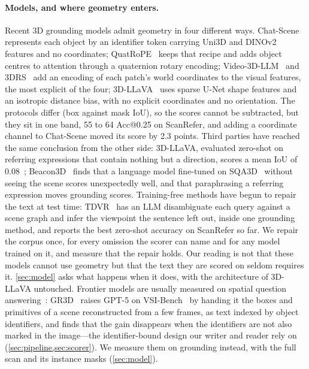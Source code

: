 \paragraph{Models, and where geometry enters.}
Recent 3D grounding models admit geometry in four different ways. Chat-Scene~\cite{chatscene} represents each object by an identifier token carrying Uni3D and DINOv2 features and no coordinates; QuatRoPE~\cite{quatrope} keeps that recipe and adds object centres to attention through a quaternion rotary encoding; Video-3D-LLM~\cite{video3dllm} and 3DRS~\cite{3drs} add an encoding of each patch's world coordinates to the visual features, the most explicit of the four; 3D-LLaVA~\cite{3dllava} uses sparse U-Net shape features and an isotropic distance bias, with no explicit coordinates and no orientation. The protocols differ (box against mask IoU), so the scores cannot be subtracted, but they sit in one band, 55 to 64 Acc@0.25 on ScanRefer, and adding a coordinate channel to Chat-Scene moved its score by 2.3 points. Third parties have reached the same conclusion from the other side: 3D-LLaVA, evaluated zero-shot on referring expressions that contain nothing but a direction, scores a mean IoU of 0.08~\cite{nanri2026viewpoint}; Beacon3D~\cite{beacon3d} finds that a language model fine-tuned on SQA3D~\cite{sqa3d} without seeing the scene scores unexpectedly well, and that paraphrasing a referring expression moves grounding scores. Training-free methods have begun to repair the text at test time: TDVR~\cite{tdvr} has an LLM disambiguate each query against a scene graph and infer the viewpoint the sentence left out, inside one grounding method, and reports the best zero-shot accuracy on ScanRefer so far. We repair the corpus once, for every omission the scorer can name and for any model trained on it, and measure that the repair holds. Our reading is not that these models cannot use geometry but that the text they are scored on seldom requires it. \cref{sec:model} asks what happens when it does, with the architecture of 3D-LLaVA untouched. Frontier models are usually measured on spatial question answering~\cite{vqa2,beacon3d}: GR3D~\cite{gr3d_zillow} raises GPT-5 on VSI-Bench~\cite{vsibench} by handing it the boxes and primitives of a scene reconstructed from a few frames, as text indexed by object identifiers, and finds that the gain disappears when the identifiers are not also marked in the image---the identifier-bound design our writer and reader rely on (\cref{sec:pipeline,sec:scorer}). We measure them on grounding instead, with the full scan and its instance masks (\cref{sec:model}).

